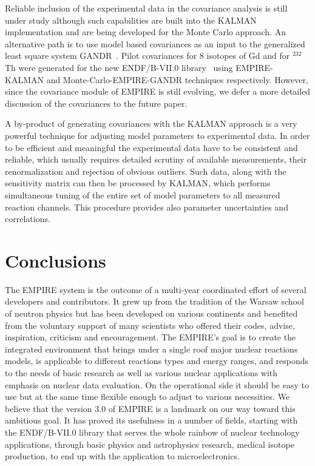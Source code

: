 \documentclass[twocolumn,amsmath,amssymb,10pt,groupedaddress,letter]{revtex4}
\begin{document}
Reliable inclusion of the experimental data in the covariance analysis is still under study although such capabilities are built into the KALMAN implementation and are being developed for the Monte Carlo approach.
An alternative path is to use model based covariances as an input to the generalized least square system GANDR~\cite{GANDR}. Pilot covariances for 8 isotopes of Gd and for $^{232}$Th were generated for the new ENDF/B-VII.0 library~\cite{ENDF-VII} using EMPIRE-KALMAN and Monte-Carlo-EMPIRE-GANDR techniques respectively. However, since the covariance module of EMPIRE is still evolving, we defer a more detailed discussion of the covariances to the future paper.

A by-product of generating covariances with the KALMAN approach is a very powerful technique for adjusting model parameters to experimental data. In order to be efficient and meaningful the experimental data have to be consistent and reliable, which usually requires detailed scrutiny of available measurements, their renormalization and rejection of obvious outliers. Such data, along with the sensitivity matrix can then be processed by KALMAN, which performs simultaneous tuning of the entire set of model parameters to all measured reaction channels. This procedure provides also parameter uncertainties and correlations.


\section{Conclusions}
The EMPIRE system is the outcome of a multi-year coordinated effort of several developers and contributors. It grew up from the tradition of the Warsaw school of neutron physics but has been developed on various continents and benefited from the voluntary support of many scientists who offered their codes, advise, inspiration, criticism and encouragement. The EMPIRE's goal is to create the integrated environment that brings under a single roof major nuclear reactions models, is applicable to different reactions types and energy ranges, and responds to the needs of basic research as well as various nuclear applications with emphasis on nuclear data evaluation. On the operational side it should be easy to use but at the same time flexible enough to adjust to various necessities. We believe that the version 3.0 of EMPIRE is a landmark on our way toward this ambitious goal. It has proved its usefulness in a number of fields, starting with the ENDF/B-VII.0 library that serves the whole rainbow of nuclear technology applications, through basic physics and  astrophysics research, medical isotope production, to end up with the  application to microelectronics.
\end{document}
